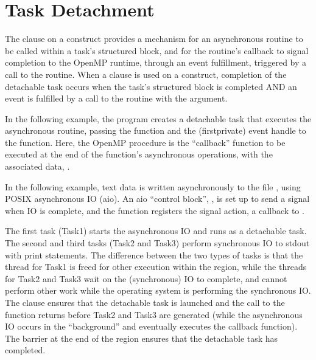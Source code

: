 \section{Task Detachment}
\label{sec:task_detachment}


The  clause on a  construct provides a mechanism for an asynchronous
routine to be called within a task's structured block, and for the routine's
callback to signal completion to the OpenMP runtime, through an 
event fulfillment, triggered by a call to the  routine.
When a  clause is used on a  construct,
completion of the detachable task occurs when the task's structured
block is completed AND an  event is
fulfilled by a call to the  
routine with the  argument.

In the following example, the program creates a detachable task
that executes the asynchronous  routine,
passing the  function and the (firstprivate) event handle
to the function. Here, the OpenMP  procedure is
the ``callback'' function to be executed at the end of the  function's
asynchronous operations,
with the associated data, . 


\clearpage

In the following example, text data is written asynchronously to the file ,
using POSIX asynchronous IO (aio). An aio ``control block'', , is set up to
send a signal when IO is complete, and the  function registers
the signal action, a callback to .

The first task (Task1) starts the asynchronous IO and runs as a detachable task.
The second and third tasks (Task2 and Task3) perform synchronous IO to stdout with print statements.
The difference between the two types of tasks is that the thread for Task1 is freed for 
other execution within the  region, while the threads for Task2 and Task3 wait
on the (synchronous) IO to complete, and cannot perform other work while the 
operating system is performing the synchronous IO. 
The  clause ensures that the detachable task is launched 
and the call to the  function returns
before Task2 and Task3 are generated (while the asynchronous IO occurs in the ``background'' and eventually
executes the callback function).  The barrier at the end of the  region ensures that the
detachable task has completed.


